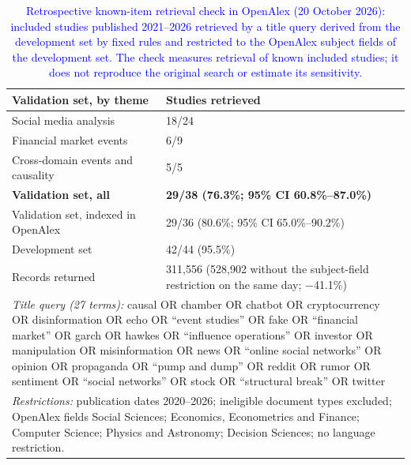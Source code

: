 \begin{table}[!htbp]
\centering
\caption{\textcolor{blue}{Retrospective known-item retrieval check in OpenAlex (20 October 2026): included studies published 2021--2026 retrieved by a title query derived from the development set by fixed rules and restricted to the OpenAlex subject fields of the development set. The check measures retrieval of known included studies; it does not reproduce the original search or estimate its sensitivity.}}
\label{tab:retrievability_check}
\scriptsize
\begin{tabular}{p{5.0cm} p{7.6cm}}
\hline
\textbf{Validation set, by theme} & \textbf{Studies retrieved} \\
\hline
Social media analysis & 18/24 \\
Financial market events & 6/9 \\
Cross-domain events and causality & 5/5 \\
\hline
\textbf{Validation set, all} & \textbf{29/38 (76.3\%; 95\% CI 60.8\%--87.0\%)} \\
Validation set, indexed in OpenAlex & 29/36 (80.6\%; 95\% CI 65.0\%--90.2\%) \\
Development set & 42/44 (95.5\%) \\
Records returned & 311,556 (528,902 without the subject-field restriction on the same day; $-$41.1\%) \\
\hline
\multicolumn{2}{p{13.0cm}}{\textit{Title query (27 terms):} causal OR chamber OR chatbot OR cryptocurrency OR disinformation OR echo OR ``event studies'' OR fake OR ``financial market'' OR garch OR hawkes OR ``influence operations'' OR investor OR manipulation OR misinformation OR news OR ``online social networks'' OR opinion OR propaganda OR ``pump and dump'' OR reddit OR rumor OR sentiment OR ``social networks'' OR stock OR ``structural break'' OR twitter} \\
\multicolumn{2}{p{13.0cm}}{\textit{Restrictions:} publication dates 2020--2026; ineligible document types excluded; OpenAlex fields Social Sciences; Economics, Econometrics and Finance; Computer Science; Physics and Astronomy; Decision Sciences; no language restriction.} \\
\hline
\end{tabular}


\end{table}
